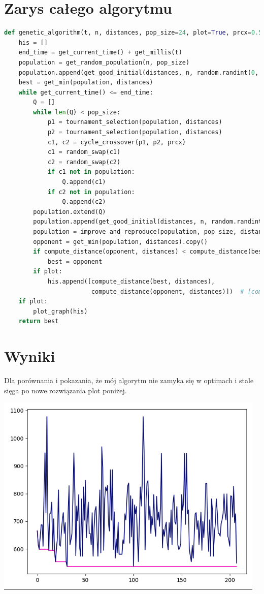 \documentclass[11pt]{article}
\begin{document}
\section{Zarys całego algorytmu}
\begin{lstlisting}[language=Python]
def genetic_algorithm(t, n, distances, pop_size=24, plot=True, prcx=0.5):
    his = []
    end_time = get_current_time() + get_millis(t)
    population = get_random_population(n, pop_size)
    population.append(get_good_initial(distances, n, random.randint(0, n - 1)))
    best = get_min(population, distances)
    while get_current_time() <= end_time:
        Q = []
        while len(Q) < pop_size:
            p1 = tournament_selection(population, distances)
            p2 = tournament_selection(population, distances)
            c1, c2 = cycle_crossover(p1, p2, prcx)
            c1 = random_swap(c1)
            c2 = random_swap(c2)
            if c1 not in population:
                Q.append(c1)
            if c2 not in population:
                Q.append(c2)
        population.extend(Q)
        population.append(get_good_initial(distances, n, random.randint(0, n - 1)))
        population = improve_and_reproduce(population, pop_size, distances)
        opponent = get_min(population, distances).copy()
        if compute_distance(opponent, distances) < compute_distance(best, distances):
            best = opponent
        if plot:
            his.append([compute_distance(best, distances),
                        compute_distance(opponent, distances)])  # [compute_distance(x, distances) for x in population])
    if plot:
        plot_graph(his)
    return best
\end{lstlisting}
\section{Wyniki}
Dla porównania i pokazania, że mój algorytm nie zamyka się w optimach i stale sięga po nowe rozwiązania plot poniżej.
\begin{center}
\includegraphics[scale=.7]{resultsga.png}
\end{center}
\end{document}
